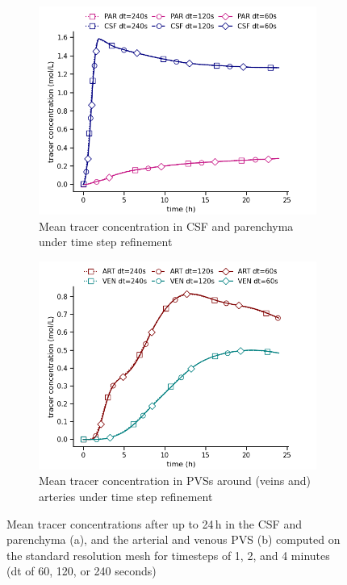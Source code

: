 \begin{figure}
    \centering
    \begin{subfigure}[b]{0.45\textwidth}
        \centering
        \includegraphics[width = 1 \linewidth]{figures/time_refinement_par_csf_mean.png}
        \caption{Mean tracer concentration in CSF and parenchyma under time step refinement}
    \end{subfigure}
    \begin{subfigure}[b]{0.45\textwidth}
        \centering
     \includegraphics[width= 1\linewidth]{figures/time_refinement_art_ven_mean.png}
         \caption{Mean tracer concentration in PVSs around (veins and) arteries under time step refinement}
    \end{subfigure}
    \caption{Mean tracer concentrations after up to 24\,h in the CSF and parenchyma (a), and the arterial and venous PVS (b) computed on the standard resolution mesh for timesteps of 1, 2, and 4 minutes (dt of 60, 120, or 240 seconds)}
    \label{fig:time_convergence_concentrations}
\end{figure}
